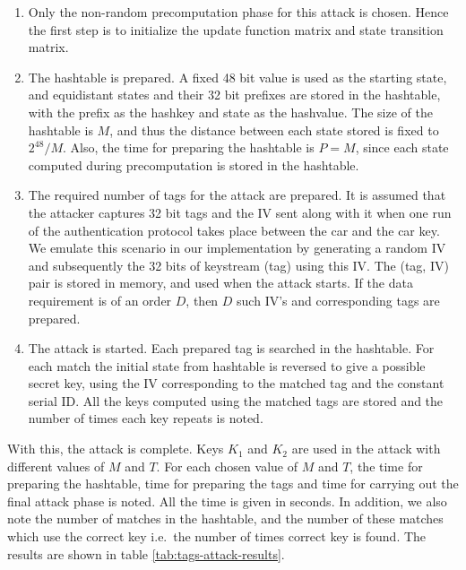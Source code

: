 \begin{enumerate}

\item Only the non-random precomputation phase for this attack is chosen. Hence the first step is to initialize the update function matrix and state transition matrix.
\item The hashtable is prepared. A fixed 48 bit value is used as the starting state, and equidistant states and their 32 bit prefixes are stored in the hashtable, with the prefix as the hashkey and state as the hashvalue. The size of the hashtable is $M$, and thus the distance between each state stored is fixed to $2^{48}/M$. Also, the time for preparing the hashtable is $P = M$, since each state computed during precomputation is stored in the hashtable.  
\item The required number of tags for the attack are prepared. It is assumed that the attacker captures 32 bit tags and the IV sent along with it when one run of the authentication protocol takes place between the car and the car key. We emulate this scenario in our implementation by generating a random IV and subsequently the 32 bits of keystream (tag) using this IV. The (tag, IV) pair is stored in memory, and used when the attack starts. If the data requirement is of an order $D$, then $D$ such IV's and corresponding tags are prepared. 
\item The attack is started. Each prepared tag is searched in the hashtable. For each match the initial state from hashtable is reversed to give a possible secret key, using the IV corresponding to the matched tag and the constant serial ID. All the keys computed using the matched tags are stored and the number of times each key repeats is noted. 
\end{enumerate}

With this, the attack is complete. Keys $K_1$ and $K_2$ are used in the attack with different values of $M$ and $T$. For each chosen value of $M$ and $T$, the time for preparing the hashtable, time for preparing the tags and time for carrying out the final attack phase is noted. All the time is given in seconds. In addition, we also note the number of matches in the hashtable, and the number of these matches which use the correct key i.e.~the number of times correct key is found. The results are shown in table \ref{tab:tags-attack-results}.

